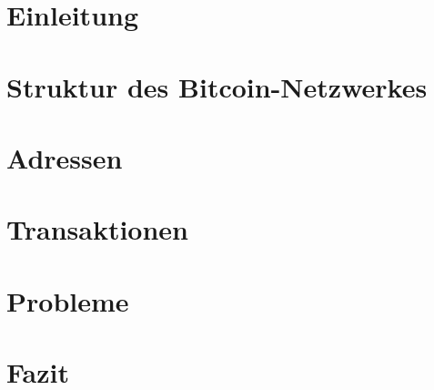 \section{Einleitung}

\section{Struktur des Bitcoin-Netzwerkes}

\section{Adressen}

\section{Transaktionen}

\section{Probleme}

\section{Fazit}
